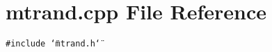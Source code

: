 \section{mtrand.cpp File Reference}
\label{mtrand_8cpp}


{\tt \#include \char`\"{}mtrand.h\char`\"{}}\par
